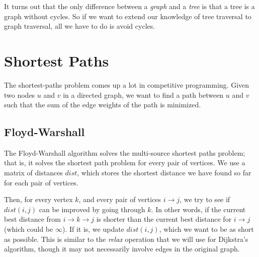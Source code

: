 It turns out that the only difference between a \textit{graph} and a \textit{tree} is that a tree is a graph without cycles. So if we want to extend our knowledge of tree traversal to graph traversal, all we have to do is avoid cycles.

\section{Shortest Paths}

The shortest-paths problem comes up a lot in competitive programming. Given two nodes $u$ and $v$ in a directed graph, we want to find a path between $u$ and $v$ such that the sum of the edge weights of the path is minimized.

\begin{center}
\end{center}


\subsection{Floyd-Warshall}

The Floyd-Warshall algorithm solves the multi-source shortest paths problem; that is, it solves the shortest path problem for every pair of vertices. We use a matrix of distances $dist$, which stores the shortest distance we have found so far for each pair of vertices.

Then, for every vertex $k$, and every pair of vertices $i \rightarrow j$, we try to see if $dist(i,j)$ can be improved by going through $k$. In other words, if the current best distance from $i \rightarrow k \rightarrow j$ is shorter than the current best distance for $i \rightarrow j$ (which could be $\infty$). If it is, we update $dist(i,j)$, which we want to be as short as possible. This is similar to the \textit{relax} operation that we will use for Dijkstra's algorithm, though it may not necessarily involve edges in the original graph.

